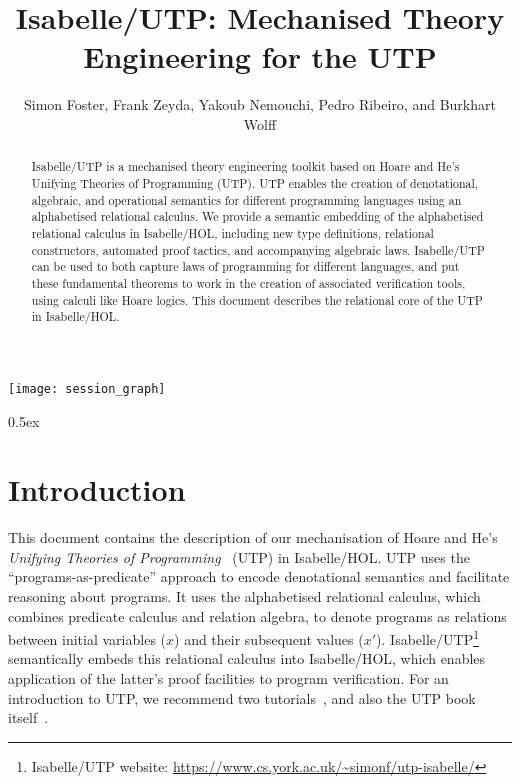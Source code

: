 \documentclass[11pt,a4paper]{article}
\begin{document}
\title{Isabelle/UTP: Mechanised Theory Engineering for the UTP}

\author{Simon Foster, Frank Zeyda, Yakoub Nemouchi, Pedro Ribeiro, and Burkhart Wolff}

\maketitle

\begin{abstract}
  Isabelle/UTP is a mechanised theory engineering toolkit based on Hoare and He's Unifying Theories of Programming
  (UTP). UTP enables the creation of denotational, algebraic, and operational semantics for different programming
  languages using an alphabetised relational calculus. We provide a semantic embedding of the alphabetised relational
  calculus in Isabelle/HOL, including new type definitions, relational constructors, automated proof tactics, and
  accompanying algebraic laws. Isabelle/UTP can be used to both capture laws of programming for different languages, and
  put these fundamental theorems to work in the creation of associated verification tools, using calculi like Hoare
  logics. This document describes the relational core of the UTP in Isabelle/HOL.
\end{abstract}

\tableofcontents

\begin{center}
  \texttt{[image: session\_graph]}
\end{center}

\parindent 0pt\parskip 0.5ex

\section{Introduction}

This document contains the description of our mechanisation of Hoare and He's \emph{Unifying Theories of
  Programming}~\cite{Hoare&98,Cavalcanti&06} (UTP) in Isabelle/HOL. UTP uses the ``programs-as-predicate'' approach to
encode denotational semantics and facilitate reasoning about programs. It uses the alphabetised relational calculus,
which combines predicate calculus and relation algebra, to denote programs as relations between initial variables ($x$)
and their subsequent values ($x'$). Isabelle/UTP\footnote{Isabelle/UTP website:
  \url{https://www.cs.york.ac.uk/~simonf/utp-isabelle/}}~\cite{Foster16a,Foster16c,Foster14c} semantically embeds this
relational calculus into Isabelle/HOL, which enables application of the latter's proof facilities to program
verification. For an introduction to UTP, we recommend two tutorials~\cite{Cavalcanti04,Cavalcanti&06}, and also the UTP
book itself~\cite{Hoare&98}.
\end{document}
